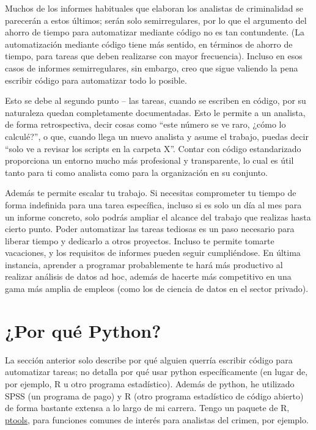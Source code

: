 \documentclass[
  letterpaper,
]{scrbook}
\begin{document}
Muchos de los informes habituales que elaboran los analistas de
criminalidad se parecerán a estos últimos; serán solo semirregulares,
por lo que el argumento del ahorro de tiempo para automatizar mediante
código no es tan contundente. (La automatización mediante código tiene
más sentido, en términos de ahorro de tiempo, para tareas que deben
realizarse con mayor frecuencia). Incluso en esos casos de informes
semirregulares, sin embargo, creo que sigue valiendo la pena escribir
código para automatizar todo lo posible.

Esto se debe al segundo punto -- las tareas, cuando se escriben en
código, por su naturaleza quedan completamente documentadas. Esto le
permite a un analista, de forma retrospectiva, decir cosas como ``este
número se ve raro, ¿cómo lo calculé?'', o que, cuando llega un nuevo
analista y asume el trabajo, puedas decir ``solo ve a revisar los
scripts en la carpeta X''. Contar con código estandarizado proporciona
un entorno mucho más profesional y transparente, lo cual es útil tanto
para ti como analista como para la organización en su conjunto.

Además te permite escalar tu trabajo. Si necesitas comprometer tu tiempo
de forma indefinida para una tarea específica, incluso si es solo un día
al mes para un informe concreto, solo podrás ampliar el alcance del
trabajo que realizas hasta cierto punto. Poder automatizar las tareas
tediosas es un paso necesario para liberar tiempo y dedicarlo a otros
proyectos. Incluso te permite tomarte vacaciones, y los requisitos de
informes pueden seguir cumpliéndose. En última instancia, aprender a
programar probablemente te hará más productivo al realizar análisis de
datos ad hoc, además de hacerte más competitivo en una gama más amplia
de empleos (como los de ciencia de datos en el sector privado).

\section*{¿Por qué Python?}\label{por-quuxe9-python}


La sección anterior solo describe por qué alguien querría escribir
código para automatizar tareas; no detalla por qué usar python
específicamente (en lugar de, por ejemplo, R u otro programa
estadístico). Además de python, he utilizado SPSS (un programa de pago)
y R (otro programa estadístico de código abierto) de forma bastante
extensa a lo largo de mi carrera. Tengo un paquete de R,
\href{https://github.com/apwheele/ptools}{ptools}, para funciones
comunes de interés para analistas del crimen, por ejemplo.
\end{document}
